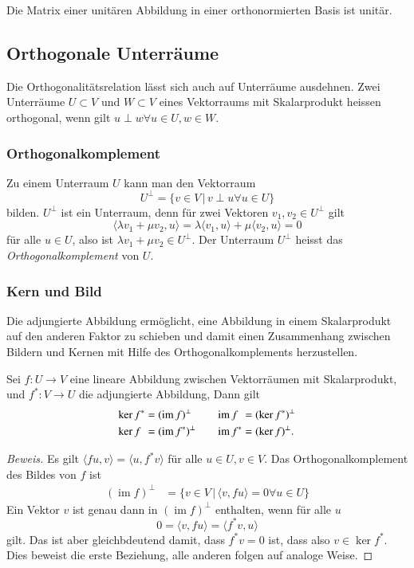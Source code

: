 Die Matrix einer unitären Abbildung in einer orthonormierten Basis ist unitär.

\subsection{Orthogonale Unterräume
\label{buch:subsection:orthogonale-unterraeume}}
Die Orthogonalitätsrelation lässt sich auch auf Unterräume ausdehnen.
Zwei Unterräume $U\subset V$ und $W\subset V$ eines Vektorraums mit
Skalarprodukt heissen orthogonal, wenn gilt
\(
u\perp w\forall u\in U,w\in W
\).

\subsubsection{Orthogonalkomplement}
Zu einem Unterraum $U$ kann man den Vektorraum
\[
U^\perp = \{ v\in V\,|\, v\perp u\forall u\in U\}
\]
bilden.
$U^\perp$ ist ein Unterraum, denn für zwei Vektoren
$v_1,v_2\in U^\perp$ gilt
\[
\langle \lambda v_1+\mu v_2,u\rangle
=
\lambda \langle v_1,u\rangle + \mu \langle v_2,u\rangle
=
0
\]
für alle $u\in U$, also ist $\lambda v_1+\mu v_2\in U^\perp$.
Der Unterraum $U^\perp$ heisst das {\em Orthogonalkomplement}
von $U$.
%

\subsubsection{Kern und Bild}
Die adjungierte Abbildung ermöglicht, eine Abbildung in einem
Skalarprodukt auf den anderen Faktor zu schieben und damit
einen Zusammenhang zwischen Bildern und Kernen mit Hilfe des
Orthogonalkomplements herzustellen.

\begin{satz}
Sei $f\colon U\to V$ eine lineare Abbildung zwischen Vektorräumen
mit Skalarprodukt, und $f^*\colon V \to U$ die adjungierte Abbildung,
Dann gilt
\[
\begin{aligned}
\ker f^*
&=
(\operatorname{im}f)^\perp
&&
&
\operatorname{im}f\phantom{\mathstrut^*}
&=
(\ker f^*)^\perp
\\
\ker f\phantom{\mathstrut^*}
&=
(\operatorname{im}f^*)^\perp
&
&&
\operatorname{im}f^*
&=
(\ker f)^\perp.
\end{aligned}
\]
\end{satz}

\begin{proof}[Beweis]
Es gilt $\langle fu,v\rangle = \langle u,f^*v\rangle$ für
alle $u\in U, v\in V$.
Das Orthogonalkomplement des Bildes von $f$ ist
\begin{align*}
(\operatorname{im} f)^\perp
&=
\{
v\in V
\,|\,
\langle v, fu\rangle=0\forall u\in U
\}
\end{align*}
Ein Vektor $v$ ist genau dann in $(\operatorname{im}f)^\perp$ enthalten,
wenn für alle $u$ 
\[
0
=
\langle v,fu\rangle
=
\langle f^*v,u\rangle
\]
gilt.
Das ist aber gleichbdeutend damit, dass $f^*v=0$ ist, dass also 
$v\in\ker f^*$.
Dies beweist die erste Beziehung, alle anderen folgen auf analoge Weise.
\end{proof}

